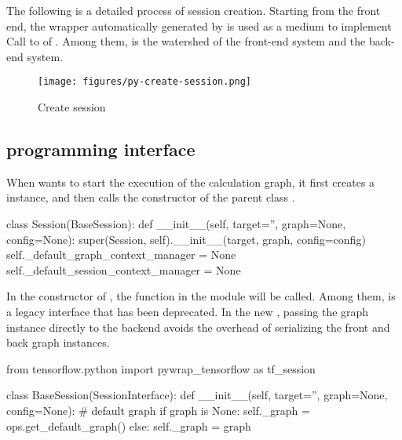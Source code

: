 \begin{content}

The following is a detailed process of session creation. Starting from the  front end, the  wrapper automatically generated by  is used as a medium to implement  Call to  of . Among them,  is the watershed of the front-end system and the back-end system.

\begin{figure}[H]
\centering
\texttt{[image: figures/py-create-session.png]}
\caption{Create session}
 \label{fig:py-create-session}
\end{figure}

\subsection{programming interface}

When  wants to start the execution of the calculation graph, it first creates a  instance, and then calls the constructor of the parent class .

\begin{leftbar}
\begin{python}[caption={tensorflow/python/client/session.py}]
class Session(BaseSession):
  def __init__(self, target='', graph=None, config=None):
    super(Session, self).__init__(target, graph, config=config)
    self._default_graph_context_manager = None
    self._default_session_context_manager = None
\end{python}
\end{leftbar}

In the constructor of , the function in the  module will be called. Among them,  is a legacy interface that has been deprecated. In the new , passing the graph instance directly to the backend  avoids the overhead of serializing the front and back graph instances.

\begin{leftbar}
\begin{python}[caption={tensorflow/python/client/session.py}]
from tensorflow.python import pywrap_tensorflow as tf_session

class BaseSession(SessionInterface):
  def __init__(self, target='', graph=None, config=None):
    # default graph
    if graph is None:
      self._graph = ops.get_default_graph()
    else:
      self._graph = graph


\end{python}
\end{leftbar}
\end{content}
